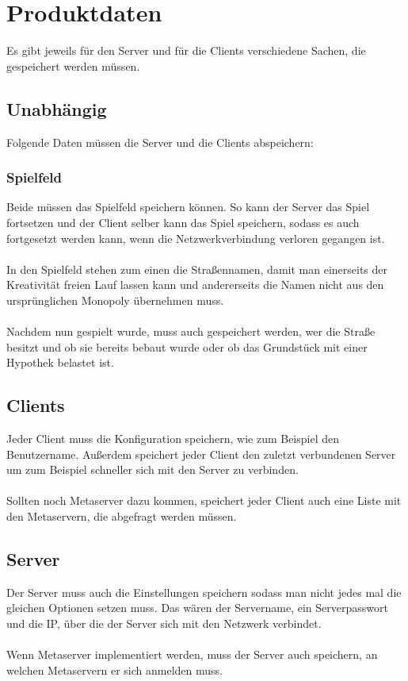 \documentclass[a4paper,10pt]{article}
\begin{document}
\section{Produktdaten}
Es gibt jeweils für den Server und für die Clients verschiedene Sachen, die gespeichert werden müssen.
\subsection{Unabhängig}
Folgende Daten müssen die Server und die Clients abspeichern:
\subsubsection{Spielfeld}
Beide müssen das Spielfeld speichern können. So kann der Server das Spiel fortsetzen und der Client selber kann das Spiel speichern, sodass es auch fortgesetzt werden kann, wenn die Netzwerkverbindung verloren gegangen ist. \\ \\
In den Spielfeld stehen zum einen die Straßennamen, damit man einerseits der Kreativität freien Lauf lassen kann und andererseits die Namen nicht aus den ursprünglichen Monopoly übernehmen muss. \\ \\
Nachdem nun gespielt wurde, muss auch gespeichert werden, wer die Straße besitzt und ob sie bereits bebaut wurde oder ob das Grundstück mit einer Hypothek belastet ist.
\subsection{Clients}
Jeder Client muss die Konfiguration speichern, wie zum Beispiel den Benutzername. Außerdem speichert jeder Client den zuletzt verbundenen Server um zum Beispiel schneller sich mit den Server zu verbinden. \\ \\
Sollten noch Metaserver dazu kommen, speichert jeder Client auch eine Liste mit den Metaservern, die abgefragt werden müssen.
\subsection{Server}
Der Server muss auch die Einstellungen speichern sodass man nicht jedes mal die gleichen Optionen setzen muss. Das wären der Servername, ein Serverpasswort und die IP, über die der Server sich mit den Netzwerk verbindet. \\ \\
Wenn Metaserver implementiert werden, muss der Server auch speichern, an welchen Metaservern er sich anmelden muss.
\end{document}
